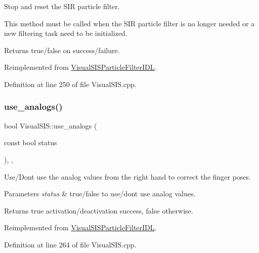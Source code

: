 Stop and reset the S\+IR particle filter. 

This method must be called when the S\+IR particle filter is no longer needed or a new filtering task need to be initialized. \begin{DoxyReturn}{Returns}
true/false on success/failure. 
\end{DoxyReturn}


Reimplemented from \hyperlink{classVisualSISParticleFilterIDL_a8a30501c75b4c7152a2abff96a950b63}{Visual\+S\+I\+S\+Particle\+Filter\+I\+DL}.



Definition at line 250 of file Visual\+S\+I\+S.\+cpp.

\mbox{\label{classVisualSIS_a703f84794cd66eb82040d2590b62f094}} 
\subsubsection{\texorpdfstring{use\+\_\+analogs()}{use\_analogs()}}
{\footnotesize\ttfamily bool Visual\+S\+I\+S\+::use\+\_\+analogs (\begin{DoxyParamCaption}\item[{const bool}]{status }\end{DoxyParamCaption})\hspace{0.3cm}{\ttfamily [override]}, {\ttfamily [protected]}, {\ttfamily [virtual]}}



Use/\+Don\textquotesingle{}t use the analog values from the right hand to correct the finger poses. 


\begin{DoxyParams}{Parameters}
{\em status} & true/false to use/don\textquotesingle{}t use analog values. \\
\hline
\end{DoxyParams}
\begin{DoxyReturn}{Returns}
true activation/deactivation success, false otherwise. 
\end{DoxyReturn}


Reimplemented from \hyperlink{classVisualSISParticleFilterIDL_a4fee3e1fbc6676767f99c8b552434709}{Visual\+S\+I\+S\+Particle\+Filter\+I\+DL}.



Definition at line 264 of file Visual\+S\+I\+S.\+cpp.



